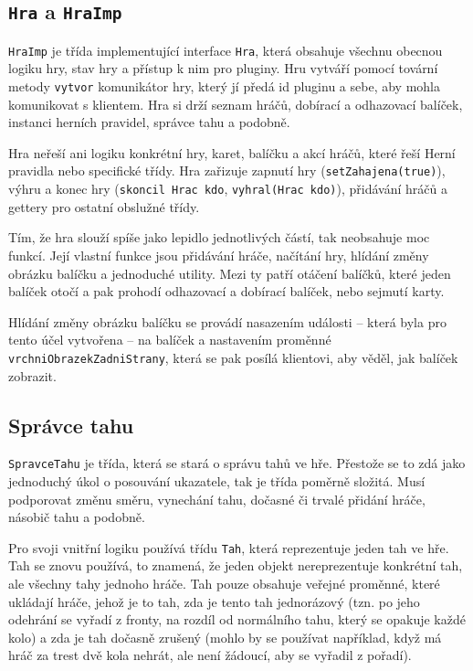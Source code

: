 \subsection{\texttt{Hra} a \texttt{HraImp}}
\texttt{HraImp} je třída implementující interface \texttt{Hra}, která obsahuje všechnu obecnou logiku hry, stav hry a přístup k nim pro pluginy. Hru vytváří pomocí tovární metody \texttt{vytvor} komunikátor hry, který jí předá id pluginu a sebe, aby mohla komunikovat s klientem. Hra si drží seznam hráčů, dobírací a odhazovací balíček, instanci herních pravidel, správce tahu a podobně.

Hra neřeší ani logiku konkrétní hry, karet, balíčku a akcí hráčů, které řeší Herní pravidla nebo specifické třídy. Hra zařizuje zapnutí hry (\texttt{setZahajena(true)}), výhru a konec hry (\texttt{skoncil Hrac kdo}, \texttt{vyhral(Hrac kdo)}), přidávání hráčů a gettery pro ostatní obslužné třídy.

Tím, že hra slouží spíše jako lepidlo jednotlivých částí, tak neobsahuje moc funkcí. Její vlastní funkce jsou přidávání hráče, načítání hry, hlídání změny obrázku balíčku a jednoduché utility. Mezi ty patří otáčení balíčků, které jeden balíček otočí a pak prohodí odhazovací a dobírací balíček, nebo sejmutí karty.

Hlídání změny obrázku balíčku se provádí nasazením události -- která byla pro tento účel vytvořena -- na balíček a nastavením proměnné \texttt{vrchniObrazekZadniStrany}, která se pak posílá klientovi, aby věděl, jak balíček zobrazit.


\subsection{Správce tahu}
\texttt{SpravceTahu} je třída, která se stará o správu tahů ve hře. Přestože se to zdá jako jednoduchý úkol o posouvání ukazatele, tak je třída poměrně složitá. Musí podporovat změnu směru, vynechání tahu, dočasné či trvalé přidání hráče, násobič tahu a podobně.

Pro svoji vnitřní logiku používá třídu \texttt{Tah}, která reprezentuje jeden tah ve hře. Tah se znovu používá, to znamená, že jeden objekt nereprezentuje konkrétní tah, ale všechny tahy jednoho hráče. Tah pouze obsahuje veřejné proměnné, které ukládají hráče, jehož je to tah, zda je tento tah jednorázový (tzn. po jeho odehrání se vyřadí z fronty, na rozdíl od normálního tahu, který se opakuje každé kolo) a zda je tah dočasně zrušený (mohlo by se používat například, když má hráč za trest dvě kola nehrát, ale není žádoucí, aby se vyřadil z pořadí).


